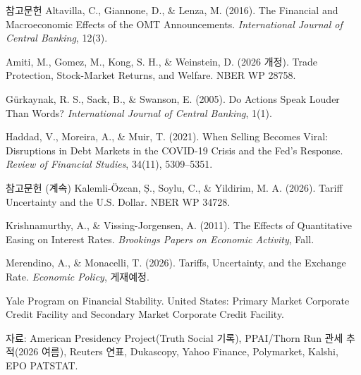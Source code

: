 \documentclass[aspectratio=169,9pt,t]{beamer}
\begin{document}
\begin{frame}{참고문헌}
\linespread{1.0}
\begingroup\fontsize{7.3}{9.6}\selectfont\RaggedRight
\setlength{\parskip}{2.2pt}
Altavilla, C., Giannone, D., \& Lenza, M. (2016). The Financial and Macroeconomic Effects of the OMT Announcements. \textit{International Journal of Central Banking}, 12(3).\par
Amiti, M., Gomez, M., Kong, S. H., \& Weinstein, D. (2026 개정). Trade Protection, Stock-Market Returns, and Welfare. NBER WP 28758.\par
Gürkaynak, R. S., Sack, B., \& Swanson, E. (2005). Do Actions Speak Louder Than Words? \textit{International Journal of Central Banking}, 1(1).\par
Haddad, V., Moreira, A., \& Muir, T. (2021). When Selling Becomes Viral: Disruptions in Debt Markets in the COVID-19 Crisis and the Fed's Response. \textit{Review of Financial Studies}, 34(11), 5309--5351.\par
\endgroup
\end{frame}

\begin{frame}{참고문헌 (계속)}
\linespread{1.0}
\begingroup\fontsize{7.3}{9.6}\selectfont\RaggedRight
\setlength{\parskip}{2.2pt}
Kalemli-Özcan, Ṣ., Soylu, C., \& Yildirim, M. A. (2026). Tariff Uncertainty and the U.S. Dollar. NBER WP 34728.\par
Krishnamurthy, A., \& Vissing-Jorgensen, A. (2011). The Effects of Quantitative Easing on Interest Rates. \textit{Brookings Papers on Economic Activity}, Fall.\par
Merendino, A., \& Monacelli, T. (2026). Tariffs, Uncertainty, and the Exchange Rate. \textit{Economic Policy}, 게재예정.\par
Yale Program on Financial Stability. United States: Primary Market Corporate Credit Facility and Secondary Market Corporate Credit Facility.\par
자료: American Presidency Project(Truth Social 기록), PPAI/Thorn Run 관세 추적(2026 여름), Reuters 연표, Dukascopy, Yahoo Finance, Polymarket, Kalshi, EPO PATSTAT.\par
\endgroup
\end{frame}
\end{document}
